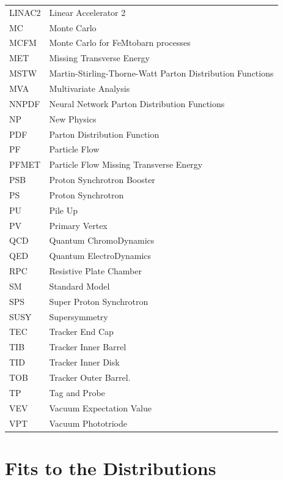 \begin{center}
\begin{longtable}{ll}
LINAC2\dotfill & Linear Accelerator 2\\
MC\dotfill & Monte Carlo\\
MCFM\dotfill & Monte Carlo for FeMtobarn processes\cite{campbellmcfm}\\
MET\dotfill & Missing Transverse Energy\\
MSTW\dotfill & Martin-Stirling-Thorne-Watt Parton Distribution Functions\cite{martin2009parton}\\
MVA\dotfill & Multivariate Analysis\\
NNPDF\dotfill & Neural Network Parton Distribution Functions\cite{Lionetti:2011pw}\\
NP\dotfill & New Physics\\
PDF\dotfill & Parton Distribution Function\\
PF\dotfill & Particle Flow\\
PFMET\dotfill & Particle Flow Missing Transverse Energy\\
PSB\dotfill & Proton Synchrotron Booster\\
PS\dotfill & Proton Synchrotron\\
PU\dotfill & Pile Up\\
PV\dotfill & Primary Vertex\\
QCD\dotfill & Quantum ChromoDynamics\\
QED\dotfill & Quantum ElectroDynamics\\
RPC\dotfill & Resistive Plate Chamber\\
SM\dotfill & Standard Model\\
SPS\dotfill & Super Proton Synchrotron\\
SUSY\dotfill & Supersymmetry\\
TEC\dotfill & Tracker End Cap\\
TIB\dotfill & Tracker Inner Barrel\\
TID\dotfill & Tracker Inner Disk\\
TOB\dotfill & Tracker Outer Barrel.\\
TP\dotfill & Tag and Probe\\
VEV\dotfill & Vacuum Expectation Value\\
VPT\dotfill & Vacuum Phototriode\\
\end{longtable}
\end{center}

\chapter{Fits to the \ETm Distributions}
